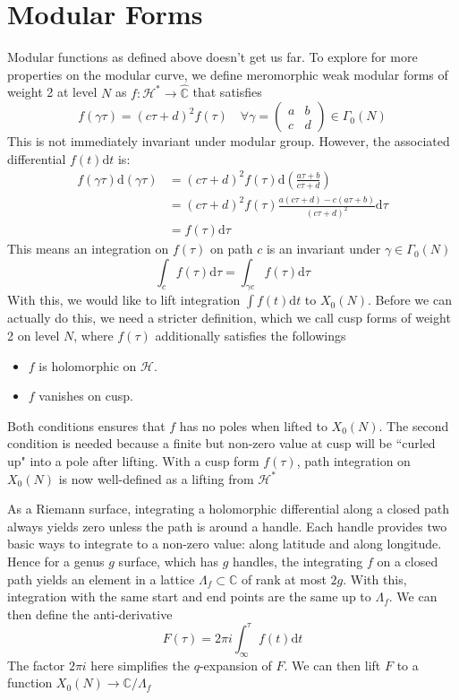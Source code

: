 \documentclass[]{article}
\newcommand{\ud}{\mathrm{d}}
\begin{document}
\section{Modular Forms}
Modular functions as defined above doesn't get us far. To explore for more properties on the modular curve, we define meromorphic weak modular forms of weight 2 at level $N$ as $f:\mathcal{H}^*\to\hat{\mathbb{C}}$ that satisfies
\[
f(\gamma\tau) = (c\tau +d)^2f(\tau)\quad \forall \gamma=\left(\begin{matrix}a & b \\ c & d\end{matrix}\right) \in\Gamma_0(N) 
\]
This is not immediately invariant under modular group. However, the associated differential $f(t)\ud t$ is:
\begin{align*}
f(\gamma\tau)\ud(\gamma\tau) &= (c\tau+d)^2f(\tau) \ud\left(\frac{a\tau + b}{c\tau +d}\right) \\
&= (c\tau+d)^2f(\tau) \frac{a(c\tau+d) - c(a\tau + b)}{(c\tau + d)^2} \ud\tau \\
&= f(\tau)\ud \tau
\end{align*}
This means an integration on $f(\tau)$ on path $c$ is an invariant under $\gamma\in\Gamma_0(N)$
\[
\int_c f(\tau)\ud \tau = \int_{\gamma c} f(\tau)\ud \tau
\]
With this, we would like to lift integration $\int f(t)\ud t$ to $X_0(N)$. Before we can actually do this, we need a stricter definition, which we call cusp forms of weight 2 on level $N$, where $f(\tau)$ additionally satisfies the followings
\begin{itemize}
	\item $f$ is holomorphic on $\mathcal{H}$.
	\item $f$ vanishes on cusp.
\end{itemize}
Both conditions ensures that $f$ has no poles when lifted to $X_0(N)$. The second condition is needed because a finite but non-zero value at cusp will be ``curled up" into a pole after lifting. With a cusp form $f(\tau)$, path integration on $X_0(N)$ is now well-defined as a lifting from $\mathcal{H}^*$

As a Riemann surface, integrating a holomorphic differential along a closed path always yields zero unless the path is around a handle. Each handle provides two basic ways to integrate to a non-zero value: along latitude and along longitude. Hence for a genus $g$ surface, which has $g$ handles, the integrating $f$ on a closed path yields an element in a lattice $\Lambda_f\subset \mathbb{C}$ of rank at most $2g$. With this, integration with the same start and end points are the same up to $\Lambda_f$. We can then define the anti-derivative
\[
F(\tau) = 2\pi i \int_{\infty}^{\tau} f(t)\ud t
\] 
The factor $2\pi i$ here simplifies the $q$-expansion of $F$. We can then lift $F$ to a function $X_0(N) \to \mathbb{C} / \Lambda_f$
\end{document}
